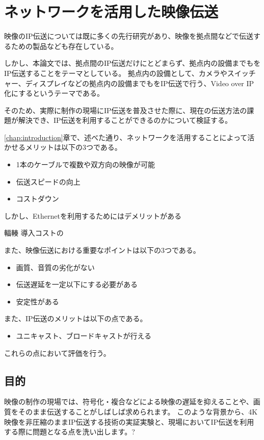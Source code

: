 \chapter{ネットワークを活用した映像伝送}
\label{chap:network-transmission}

映像のIP伝送については既に多くの先行研究があり、映像を拠点間などで伝送するための製品なども存在している。

しかし、本論文では、拠点間のIP伝送だけにとどまらず、拠点内の設備までもをIP伝送することをテーマとしている。
拠点内の設備として、カメラやスイッチャー、ディスプレイなどの拠点内の設備までもをIP伝送で行う、Video over IP化にするというテーマである。

そのため、実際に制作の現場にIP伝送を普及させた際に、現在の伝送方法の課題が解決でき、IP伝送を利用することができるのかについて検証する。


\ref{chap:introduction}章で、述べた通り、ネットワークを活用することによって活かせるメリットは以下の3つである。

\begin{itemize}
  \item 1本のケーブルで複数や双方向の映像が可能
  \item 伝送スピードの向上
  \item コストダウン
\end{itemize}

しかし、Ethernetを利用するためにはデメリットがある

輻輳
導入コストの

また、映像伝送における重要なポイントは以下の3つである。

\begin{itemize}
  \item 画質、音質の劣化がない
  \item 伝送遅延を一定以下にする必要がある
  \item 安定性がある
\end{itemize}

また、IP伝送のメリットは以下の点である。

\begin{itemize}
  \item ユニキャスト、ブロードキャストが行える
\end{itemize}

これらの点において評価を行う。

\section{目的}

映像の制作の現場では、符号化・複合などによる映像の遅延を抑えることや、画質をそのまま伝送することがしばしば求められます。
このような背景から、4K映像を非圧縮のままIP伝送する技術の実証実験と、現場においてIP伝送を利用する際に問題となる点を洗い出します。?

